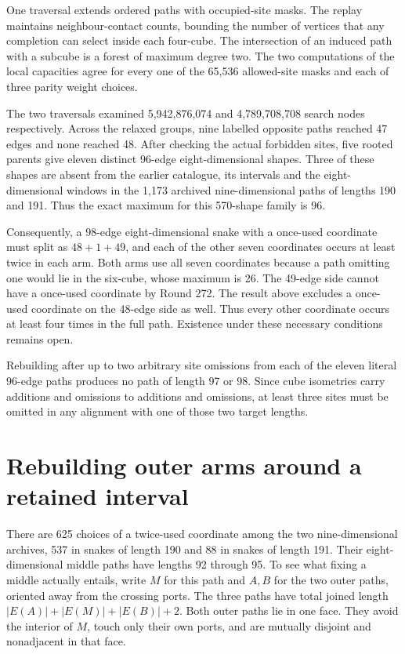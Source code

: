 \documentclass[11pt,a4paper]{article}
\theoremstyle{definition}
\theoremstyle{remark}
\begin{document}
One traversal extends ordered paths with occupied-site masks. The replay maintains neighbour-contact counts, bounding the number of vertices that any completion can select inside each four-cube. The intersection of an induced path with a subcube is a forest of maximum degree two. The two computations of the local capacities agree for every one of the 65,536 allowed-site masks and each of three parity weight choices.

The two traversals examined 5,942,876,074 and 4,789,708,708 search nodes respectively. Across the relaxed groups, nine labelled opposite paths reached 47 edges and none reached 48. After checking the actual forbidden sites, five rooted parents give eleven distinct 96-edge eight-dimensional shapes. Three of these shapes are absent from the earlier catalogue, its intervals and the eight-dimensional windows in the 1,173 archived nine-dimensional paths of lengths 190 and 191. Thus the exact maximum for this 570-shape family is 96.

Consequently, a 98-edge eight-dimensional snake with a once-used coordinate must split as \(48+1+49\), and each of the other seven coordinates occurs at least twice in each arm. Both arms use all seven coordinates because a path omitting one would lie in the six-cube, whose maximum is 26. The 49-edge side cannot have a once-used coordinate by Round 272. The result above excludes a once-used coordinate on the 48-edge side as well. Thus every other coordinate occurs at least four times in the full path. Existence under these necessary conditions remains open.

Rebuilding after up to two arbitrary site omissions from each of the eleven literal 96-edge paths produces no path of length 97 or 98. Since cube isometries carry additions and omissions to additions and omissions, at least three sites must be omitted in any alignment with one of those two target lengths.

\section{Rebuilding outer arms around a retained interval}
There are 625 choices of a twice-used coordinate among the two nine-dimensional archives, 537 in snakes of length 190 and 88 in snakes of length 191. Their eight-dimensional middle paths have lengths 92 through 95. To see what fixing a middle actually entails, write \(M\) for this path and \(A,B\) for the two outer paths, oriented away from the crossing ports. The three paths have total joined length \(|E(A)|+|E(M)|+|E(B)|+2\). Both outer paths lie in one face. They avoid the interior of \(M\), touch only their own ports, and are mutually disjoint and nonadjacent in that face.
\end{document}
